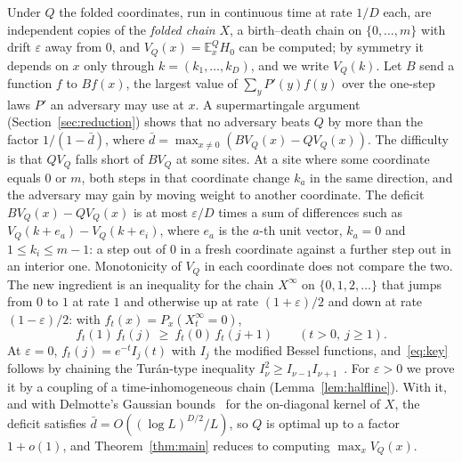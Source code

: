 \documentclass[11pt]{amsart}
\theoremstyle{remark}
\newcommand{\eps}{\varepsilon}
\newcommand{\E}{\mathbb{E}}
\begin{document}
Under $Q$ the folded coordinates, run in continuous time at rate $1/D$ each, are independent copies of the
\emph{folded chain} $X$, a birth--death chain on $\{0,\dots,m\}$ with drift $\eps$ away from $0$, and $V_Q(x)=\E^Q_xH_0$ can be computed; by symmetry it depends on $x$ only through
$k=(k_1,\dots,k_D)$, and we write $V_Q(k)$.
Let $B$ send a function $f$ to $Bf(x)$, the largest value of $\sum_yP'(y)f(y)$ over the one-step laws $P'$ an
adversary may use at $x$. A supermartingale argument (Section~\ref{sec:reduction}) shows that no adversary beats $Q$
by more than the factor $1/(1-\bar d)$, where $\bar d=\max_{x\ne0}(BV_Q(x)-QV_Q(x))$. The difficulty is that $QV_Q$ falls
short of $BV_Q$ at some sites. At a site where some coordinate equals $0$ or $m$, both steps in that coordinate change $k_a$ in the same
direction, and the adversary may gain by moving weight to another coordinate. The deficit $BV_Q(x)-QV_Q(x)$ is at most
$\eps/D$ times a sum of differences such as $V_Q(k+e_a)-V_Q(k+e_i)$, where $e_a$ is the $a$-th unit vector, $k_a=0$
and $1\le k_i\le m-1$: a step out of $0$ in a fresh coordinate against a further step out in an interior one.
Monotonicity of $V_Q$ in each coordinate does not compare the two. The new ingredient is an inequality for the chain
$X^\infty$ on $\{0,1,2,\dots\}$ that jumps from $0$ to $1$ at rate $1$ and otherwise up at rate $(1+\eps)/2$ and
down at rate $(1-\eps)/2$: with $f_t(x)=P_x(X^\infty_t=0)$,
\begin{equation}\label{eq:key}
f_t(1)\,f_t(j)\ \ge\ f_t(0)\,f_t(j+1)\qquad(t>0,\ j\ge1).
\end{equation}
At $\eps=0$, $f_t(j)=e^{-t}I_j(t)$ with $I_j$ the modified Bessel functions, and~\eqref{eq:key} follows by chaining the
Tur\'an-type inequality $I_\nu^2\ge I_{\nu-1}I_{\nu+1}$~\cite{BP}. For $\eps>0$ we prove it by a coupling of a
time-inhomogeneous chain (Lemma~\ref{lem:halfline}). With it, and with Delmotte's Gaussian
bounds~\cite{Del99} for the on-diagonal kernel of $X$, the deficit satisfies $\bar d=O((\log L)^{D/2}/L)$, so $Q$ is
optimal up to a factor $1+o(1)$, and Theorem~\ref{thm:main} reduces to computing $\max_xV_Q(x)$.
\end{document}
